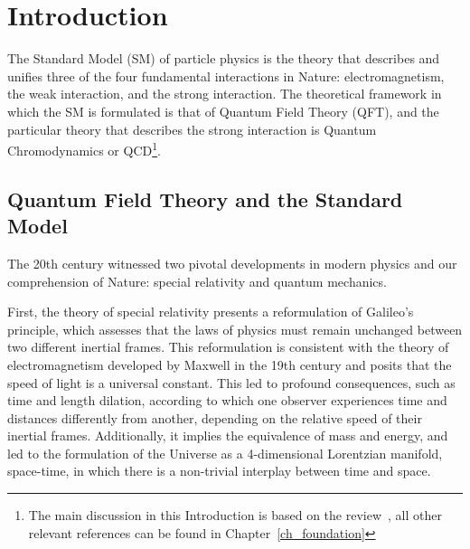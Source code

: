 \chapter*{Introduction}

\label{ch_introduction}



The Standard Model (SM) of particle physics is the theory that describes and unifies three of the four fundamental interactions in Nature: electromagnetism, the weak interaction, and the strong interaction. The theoretical framework in which the SM is formulated is that of Quantum Field Theory (QFT), and the particular theory that describes the strong interaction is Quantum Chromodynamics or QCD\footnote{The main discussion in this Introduction is based on the review~\citep{Wilczek:1998ma}, all other relevant references can be found in Chapter~\ref{ch_foundation}}.

\section*{Quantum Field Theory and the Standard Model}

The 20th century witnessed two pivotal developments in modern physics and our comprehension of Nature: special relativity and quantum mechanics. 

First, the theory of special relativity presents a reformulation of Galileo's principle, which assesses that the laws of physics must remain unchanged between two different inertial frames. This reformulation is consistent with the theory of electromagnetism developed by Maxwell in the 19th century and posits that the speed of light is a universal constant. This led to profound consequences, such as time and length dilation, according to which one observer experiences time and distances differently from another, depending on the relative speed of their inertial frames. Additionally, it implies the equivalence of mass and energy, and led to the formulation of the Universe as a 4-dimensional Lorentzian manifold, space-time, in which there is a non-trivial interplay between time and space.

